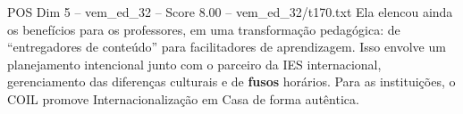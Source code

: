 \begin{textsample}{POS Dim 5 – vem\_ed\_32 – Score 8.00 – vem\_ed\_32/t170.txt}
Ela elencou ainda os benefícios para os professores, em uma transformação pedagógica: de “entregadores de conteúdo” para facilitadores de aprendizagem.
Isso envolve um planejamento intencional junto com o parceiro da IES internacional, gerenciamento das diferenças culturais e de \textbf{fusos} horários.
Para as instituições, o COIL promove Internacionalização em Casa de forma autêntica.

\end{textsample}
